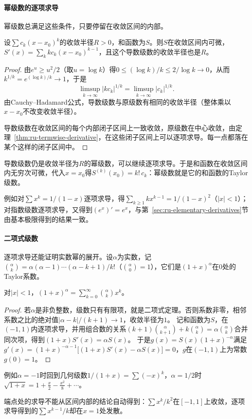 \paragraph{幂级数的逐项求导}
幂级数总满足这些条件，只要停留在收敛区间的内部。
\begin{theorem}[幂级数的逐项求导]
\label{thm:ru-power-series-derivative}
设$\sum c_k(x-x_0)^k$的收敛半径$R>0$，和函数为$S$。则$S$在收敛区间内可微，$S'(x)=\sum_kkc_k(x-x_0)^{k-1}$，且这个导数级数的收敛半径也是$R$。
\end{theorem}
\begin{proof}
由$e^u\geq u^2/2$（取$u=\log k$）得$0\leq(\log k)/k\leq2/\log k\to0$，从而$k^{1/k}=e^{(\log k)/k}\to1$，于是
\[
 \limsup_{k\to\infty}|kc_k|^{1/k}=\limsup_{k\to\infty}|c_k|^{1/k}.
\]
由Cauchy--Hadamard公式，导数级数与原级数有相同的收敛半径（整体乘以$x-x_0$不改变收敛半径）。

导数级数在收敛区间的每个内部闭子区间上一致收敛，原级数在中心收敛，由定理~\ref{thm:ru-termwise-derivative}，在这些闭子区间上可以逐项求导。每一点都落在某个这样的闭子区间中。
\end{proof}
导数级数仍是收敛半径为$R$的幂级数，可以继续逐项求导。于是和函数在收敛区间内无穷次可微，代入$x=x_0$得$S^{(k)}(x_0)=k!\,c_k$：幂级数就是它的和函数的Taylor级数。

例如对$\sum x^k=1/(1-x)$逐项求导，得$\sum_{k\geq1}kx^{k-1}=1/(1-x)^2$（$|x|<1$）；对指数级数逐项求导，又得到$(e^x)'=e^x$，与第~\ref{sec:ru-elementary-derivatives}节由基本极限得到的结果一致。

\paragraph{二项式级数}
逐项求导还能证明实数幂的展开。设$\alpha$为实数，记$\binom\alpha k=\alpha(\alpha-1)\cdots(\alpha-k+1)/k!$（$\binom\alpha0=1$），它们是$(1+x)^\alpha$在$0$处的Taylor系数。
\begin{theorem}[二项式级数]
\label{thm:ru-binomial-series}
对$|x|<1$，$(1+x)^\alpha=\sum_{k=0}^\infty\binom\alpha kx^k$。
\end{theorem}
\begin{proof}
若$\alpha$是非负整数，级数只有有限项，就是二项式定理。否则系数非零，相邻系数之比的绝对值$|\alpha-k|/(k+1)\to1$，收敛半径为$1$。
记和函数为$S$，在$(-1,1)$内逐项求导，并用组合数的关系$(k+1)\binom\alpha{k+1}+k\binom\alpha k=\alpha\binom\alpha k$合并同次项，得到$(1+x)S'(x)=\alpha S(x)$。
于是$g(x)=S(x)(1+x)^{-\alpha}$满足$g'(x)=(1+x)^{-\alpha-1}\bigl[(1+x)S'(x)-\alpha S(x)\bigr]=0$，$g$在$(-1,1)$上为常数$g(0)=1$。
\end{proof}
例如$\alpha=-1$时回到几何级数$1/(1+x)=\sum(-x)^k$，$\alpha=1/2$时$\sqrt{1+x}=1+\tfrac x2-\tfrac{x^2}8+\cdots$。

端点处的求导不能从区间内部的结论自动得到：$\sum x^k/k^2$在$[-1,1]$上收敛，逐项求导得到的$\sum x^{k-1}/k$却在$x=1$处发散。
